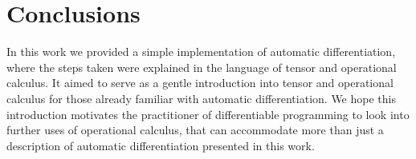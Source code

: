 \section{Conclusions}

In this work we provided a simple implementation of automatic differentiation, where the steps taken were explained in the language of tensor and operational calculus. It aimed to serve as a gentle introduction into tensor and operational calculus for those already familiar with automatic differentiation.
We hope this introduction motivates the practitioner of differentiable programming to look into further uses of operational calculus, that can accommodate more than just a description of automatic differentiation presented in this work.
